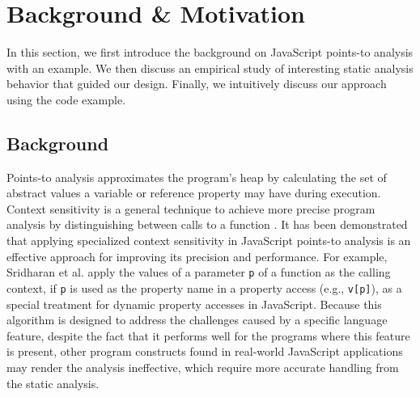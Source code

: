 \section{Background \& Motivation}
\label{background}

In this section, we first introduce the background on JavaScript points-to analysis with an example. We then discuss an empirical study of interesting static analysis behavior that guided our design. Finally, we intuitively discuss our approach using the code example.

\subsection{Background}


Points-to analysis approximates the program's heap by calculating the set of abstract values a variable or reference property may have during execution. Context sensitivity is a general technique to achieve more precise program analysis by distinguishing between calls to a function \cite{sharir1981two}. It has been demonstrated that applying specialized context sensitivity in JavaScript points-to analysis is an effective approach for improving its precision and performance. For example, Sridharan et al. \cite{Sridharan:2012:CTP:2367163.2367191} apply the values of a parameter {\tt p} of a function as the calling context, if {\tt p} is used as the property name in a property access (e.g., {\tt v[p]}), as a special treatment for dynamic property accesses in JavaScript. Because this algorithm is designed to address the challenges caused by a specific language feature, despite the fact that it performs well for the programs where this feature is present, other program constructs found in real-world JavaScript applications may render the analysis ineffective, which require more accurate handling from the static analysis.

